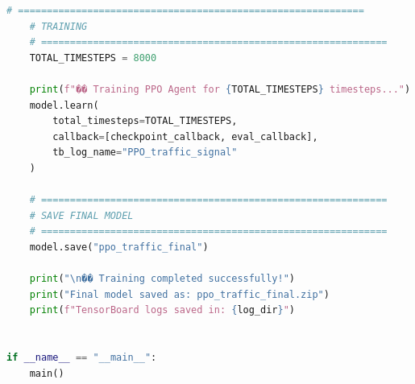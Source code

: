 \documentclass[11pt, a4paper]{report}
\begin{document}
\begin{lstlisting}[language=Python, caption={PPO Testing Script --- Tsotlhe N. Seiphepi (ID: 21001137)}]
    # ============================================================
    # TRAINING
    # ============================================================
    TOTAL_TIMESTEPS = 8000

    print(f"�� Training PPO Agent for {TOTAL_TIMESTEPS} timesteps...")
    model.learn(
        total_timesteps=TOTAL_TIMESTEPS,
        callback=[checkpoint_callback, eval_callback],
        tb_log_name="PPO_traffic_signal"
    )

    # ============================================================
    # SAVE FINAL MODEL
    # ============================================================
    model.save("ppo_traffic_final")

    print("\n�� Training completed successfully!")
    print("Final model saved as: ppo_traffic_final.zip")
    print(f"TensorBoard logs saved in: {log_dir}")


if __name__ == "__main__":
    main()

\end{lstlisting}
\begin{lstlisting}
\end{lstlisting}


\begin{lstlisting}
\end{lstlisting}



\begin{lstlisting}
\end{lstlisting}
\end{document}
